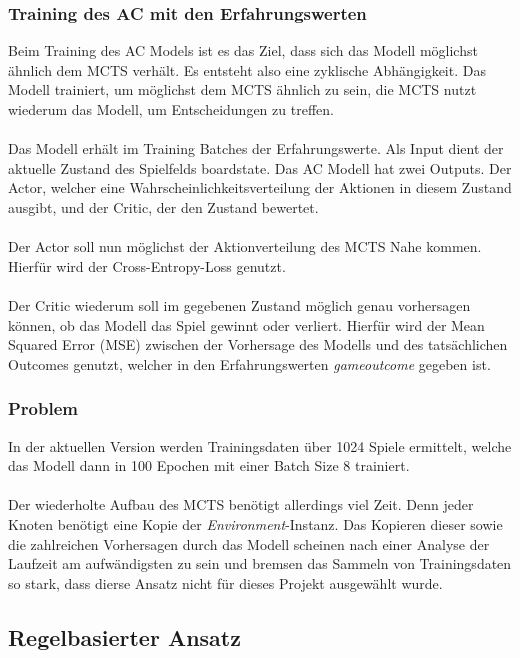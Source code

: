 \subsubsection*{Training des AC mit den Erfahrungswerten}
Beim Training des AC Models ist es das Ziel, dass sich das Modell möglichst ähnlich dem MCTS verhält. Es entsteht also eine zyklische Abhängigkeit. Das Modell trainiert, um möglichst dem MCTS ähnlich zu sein, die MCTS nutzt wiederum das Modell, um Entscheidungen zu treffen. 
\\\\
Das Modell erhält im Training Batches der Erfahrungswerte. Als Input dient der aktuelle Zustand des Spielfelds board\textunderscore{}state. Das AC Modell hat zwei Outputs. Der Actor, welcher eine Wahrscheinlichkeitsverteilung der Aktionen in diesem Zustand ausgibt, und der Critic, der den Zustand bewertet. 
\\\\
Der Actor soll nun möglichst der Aktionverteilung des MCTS Nahe kommen. Hierfür wird der Cross-Entropy-Loss genutzt.
\\\\
Der Critic wiederum soll im gegebenen Zustand möglich genau vorhersagen können, ob das Modell das Spiel gewinnt oder verliert. Hierfür wird der Mean Squared Error (MSE) zwischen der Vorhersage des Modells und des tatsächlichen Outcomes genutzt, welcher in den Erfahrungswerten \textit{game\textunderscore{}outcome} gegeben ist.

\subsubsection*{Problem}
In der aktuellen Version werden Trainingsdaten über 1024 Spiele ermittelt, welche das Modell dann in 100 Epochen mit einer Batch Size 8 trainiert.
\\\\
Der wiederholte Aufbau des MCTS benötigt allerdings viel Zeit. Denn jeder Knoten benötigt eine Kopie der \textit{Environment}-Instanz. Das Kopieren dieser sowie die zahlreichen Vorhersagen durch das Modell scheinen nach einer Analyse der Laufzeit am aufwändigsten zu sein und bremsen das Sammeln von Trainingsdaten so stark, dass dierse Ansatz nicht für dieses Projekt ausgewählt wurde.

\subsection{Regelbasierter Ansatz}

